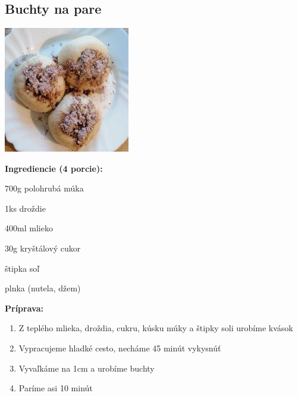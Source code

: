 \setcounter{step}{0}

\subsection{ Buchty na pare }

\begin{ingredient}
  
      \includegraphics[height=5.5cm]{images/buchty_na_pare}
  
  \def\portions{  }
  \textbf{ {\normalsize Ingrediencie (4 porcie):} }

  \begin{main}
      \item 700g polohrubá múka
      \item 1ks droždie
      \item 400ml mlieko
      \item 30g kryštálový cukor
      \item štipka soľ
      \item plnka (nutela, džem)
  \end{main}
  
\end{ingredient}
\begin{recipe}
\textbf{ {\normalsize Príprava:} }
\begin{enumerate}

  \item{Z teplého mlieka, droždia, cukru, kúsku múky a štipky soli urobíme kvások}
  \item{Vypracujeme hladké cesto, necháme 45 minút vykysnúť}
  \item{Vyvaľkáme na 1cm a urobíme buchty}
  \item{Paríme asi 10 minút}

\end{enumerate}
\end{recipe}

\begin{notes}
  
\end{notes}	
\clearpage
